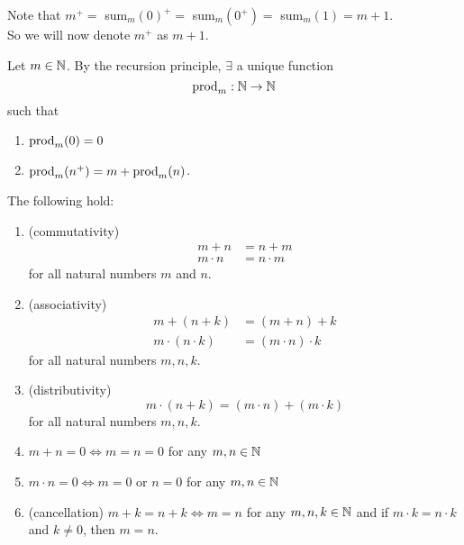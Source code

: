 \begin{rem}
    Note that $m^{+} =$ sum$_{m}(0)^{+} = $ sum$_{m}(0^{+}) = $ sum$_{m}(1) = m + 1$. \\
    So we will now denote $m^{+}$ as $m + 1$.
\end{rem}

\begin{defn} \label{defn:N:multiplication}
    Let $m \in \mathbb{N}$. By the recursion principle, $\exists$ a unique function \[
        \mathrm{prod}_{m} : \mathbb{N} \to \mathbb{N}
    \]
    such that
    \begin{enumerate}[label=(\alph*)]
        \item\label{defn:N:multiplication:zero} $\mathrm{prod}_{m}({0}) = 0$
        \item\label{defn:N:multiplication:recursion} $\mathrm{prod}_{m}({n^{+}}) = m + \mathrm{prod}_{m}({n})$.
    \end{enumerate}
\end{defn}

\begin{thm} \label{thm:N:properties}
    The following hold:
    \begin{enumerate}[label=(\alph*)]
        \item\label{thm:N:properties:commutativity} (commutativity)
        \begin{align*}
            m + n &= n + m \\
            m \cdot n &= n \cdot m
        \end{align*}
        for all natural numbers $m$ and $n$.

        \item\label{thm:N:properties:associativity} (associativity)
        \begin{align*}
            m + (n + k) &= (m + n) + k \\
            m \cdot (n \cdot k) &= (m \cdot n) \cdot k
        \end{align*}
        for all natural numbers $m, n, k$.

        \item\label{thm:N:distributivity} (distributivity) \[
            m \cdot (n + k) = (m \cdot n) + (m \cdot k)
        \] for all natural numbers $m, n, k$.
        \item\label{thm:N:zero_sum} $m + n = 0 \iff m = n = 0$ for any $m, n \in \mathbb{N}$

        \item\label{thm:N:zero_product} $m \cdot n = 0 \iff m = 0$ or $n = 0$ for any $m, n \in \mathbb{N}$

        \item\label{thm:N:cancellation} (cancellation) $m + k = n + k \iff m = n$ for any $m, n, k \in \mathbb{N}$ and if $m \cdot k = n \cdot k$ and $k \neq 0$, then $m = n$.
    \end{enumerate}
\end{thm}

